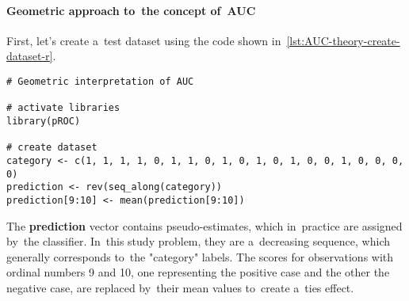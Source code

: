 \documentclass[]{scrreprt}
\begin{document}
\paragraph{Geometric approach to~the concept of~AUC}
First, let's create a~test dataset using the code shown in~\ref{lst:AUC-theory-create-dataset-r}.
%
\begin{lstlisting}[float=htp, caption = Create a~test data set, firstnumber=1, label= lst:AUC-theory-create-dataset-r]
# Geometric interpretation of AUC

# activate libraries
library(pROC)

# create dataset
category <- c(1, 1, 1, 1, 0, 1, 1, 0, 1, 0, 1, 0, 1, 0, 0, 1, 0, 0, 0, 0)
prediction <- rev(seq_along(category))
prediction[9:10] <- mean(prediction[9:10])
\end{lstlisting}
%
The \textbf{prediction} vector contains pseudo-estimates, which in~practice are assigned by~the classifier. In~this study problem, they are a~decreasing sequence, which generally corresponds to~the "category" labels. The scores for observations with ordinal numbers 9 and 10, one representing the positive case and the other the negative case, are replaced by~their mean values to~create a~ties effect.
\end{document}
